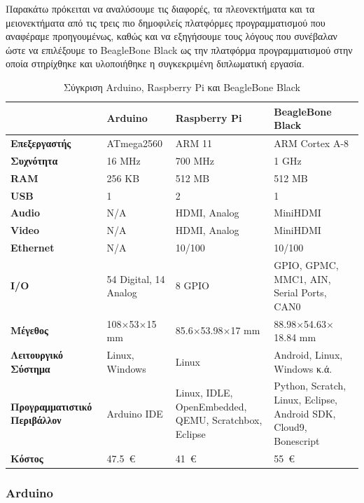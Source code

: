 \documentclass[12pt, a4paper, oneside]{report}
\begin{document}
Παρακάτω πρόκειται να αναλύσουμε τις διαφορές, τα πλεονεκτήματα και τα μειονεκτήματα από τις τρεις πιο δημοφιλείς πλατφόρμες προγραμματισμού που αναφέραμε προηγουμένως, καθώς και να εξηγήσουμε τους λόγους που συνέβαλαν ώστε να επιλέξουμε το BeagleBone Black ως την πλατφόρμα προγραμματισμού στην οποία στηρίχθηκε και υλοποιήθηκε η συγκεκριμένη διπλωματική εργασία.

\begin{table}[!hp]
\centering
{\renewcommand{\arraystretch}{1.5}
\renewcommand{\tabcolsep}{0.2cm}
\footnotesize
\begin{tabular}{L{0.25\textwidth} R{0.2\textwidth} R{0.2\textwidth} R{0.25\textwidth}}
\hline
 & \textbf{Arduino} & \textbf{Raspberry Pi} & \textbf{BeagleBone Black}\\ \hline
\textbf{Επεξεργαστής} & ATmega2560 & ARM 11 & ARM Cortex A-8\\ \hline
\textbf{Συχνότητα} & 16 MHz & 700 MHz & 1 GHz\\ \hline
\textbf{RAM} & 256 KB & 512 MB & 512 MB\\ \hline
\textbf{USB} & 1 & 2 & 1\\ \hline
\textbf{Audio} & N\slash A & HDMI, Analog & MiniHDMI\\ \hline
\textbf{Video} & N\slash A & HDMI, Analog & MiniHDMI\\ \hline
\textbf{Ethernet} & N\slash A & 10\slash 100 & 10\slash 100\\ \hline
\textbf{I\slash O} & 54 Digital, 14 Analog & 8 GPIO & GPIO, GPMC, MMC1, AIN, Serial Ports, CAN0\\ \hline
\textbf{Μέγεθος} & 108$\times$53$\times$15 mm & 85.6$\times$53.98$\times$17 mm & 88.98$\times$54.63$\times$18.84 mm\\ \hline
\textbf{Λειτουργικό Σύστημα} & Linux, Windows & Linux & Android, Linux, Windows κ.ά.\\ \hline
\textbf{Προγραμματιστικό Περιβάλλον} & Arduino IDE & Linux, IDLE, OpenEmbedded, QEMU, Scratchbox, Eclipse & Python, Scratch, Linux, Eclipse, Android SDK, Cloud9, Bonescript\\ \hline
\textbf{Κόστος} & 47.5~\euro & 41~\euro & 55~\euro\\ \hline
\end{tabular}
}
\caption{Σύγκριση Arduino, Raspberry Pi και BeagleBone Black}
\end{table}
\clearpage

\subsubsection{Arduino}
\end{document}
